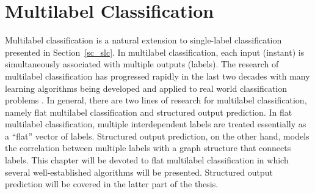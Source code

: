 {




%
%
\chapter{Multilabel Classification} \label{ch_fmlc}

Multilabel classification is a natural extension to single-label classification presented in Section~\ref{sc_slc}.
In multilabel classification, each input (instant) is simultaneously associated with multiple outputs (labels).
The research of multilabel classification has progressed rapidly in the last two decades with many learning algorithms being developed and applied to real world classification problems \citep{lafferty01,taskar02,Taskar04max,THJA04,Rousu07}.
In general, there are two lines of research for multilabel classification, namely flat multilabel classification and structured output prediction.
In flat multilabel classification, multiple interdependent labels are treated essentially as a ``flat'' vector of labels.
Structured output prediction, on the other hand, models the correlation between multiple labels with a graph structure that connects labels.
This chapter will be devoted to flat multilabel classification in which several well-established algorithms will be presented.
Structured output prediction will be covered in the latter part of the thesis.

}
